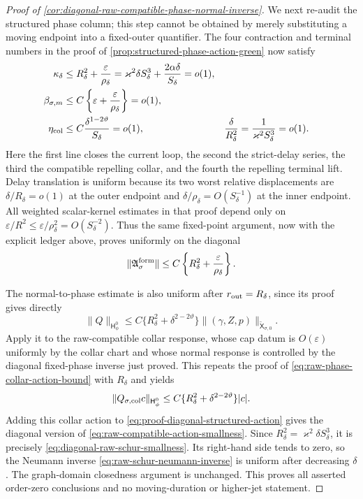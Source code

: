 \begin{proof}[Proof of
\cref{cor:diagonal-raw-compatible-phase-normal-inverse}]
We next re-audit the structured phase column; this step cannot be obtained
by merely substituting a moving endpoint into a fixed-outer quantifier.
The four contraction and terminal numbers in the proof of
\cref{prop:structured-phase-action-green} now satisfy
\begin{align}
 \kappa_\delta
 &\le R_\delta^2+\frac{\varepsilon}{\rho_\delta}
 =\varkappa^2\delta S_\delta^3
       +\frac{2\alpha\delta}{S_\delta}=o(1),\notag\\
 \beta_{\sigma,m}
 &\le C\left\{\varepsilon
       +\frac{\varepsilon}{\rho_\delta}\right\}
 =o(1),\notag\\
 \eta_{\rm col}
 &\le C\frac{\delta^{1-2\vartheta}}{S_\delta}=o(1),
 &\frac{\delta}{R_\delta^2}
 &=\frac1{\varkappa^2S_\delta^3}=o(1).
                                                        \label{eq:proof-diagonal-structured-ledger}
\end{align}
Here the first line closes the current loop, the second the strict-delay
series, the third the compatible repelling collar, and the fourth the
repelling terminal lift.  Delay translation is uniform because its two
worst relative displacements are
\(\delta/R_\delta=o(1)\) at the outer endpoint and
\(\delta/\rho_\delta=O(S_\delta^{-1})\) at the inner endpoint.
All weighted scalar-kernel estimates in that proof depend only on
\(\varepsilon/R^2\le\varepsilon/\rho_\delta^2=O(S_\delta^{-2})\).
Thus the same fixed-point argument, now with the explicit ledger above,
proves uniformly on the diagonal
\begin{equation}
 \|\mathfrak A_\sigma^{\rm form}\|
 \le C\left\{R_\delta^2+\frac{\varepsilon}{\rho_\delta}\right\}.
                                                        \label{eq:proof-diagonal-structured-action}
\end{equation}

The normal-to-phase estimate is also uniform after
\(r_{\rm out}=R_\delta\), since its proof gives directly
\[
 \|Q\|_{\mathsf H_\phi^0}
 \le C\{R_\delta^2+\delta^{2-2\vartheta}\}
       \|(\gamma,Z,p)\|_{\widetilde{\mathsf X}_{\sigma,0}}.
\]
Apply it to the raw-compatible collar response, whose cap datum is
\(O(\varepsilon)\) uniformly by the collar chart and whose normal response
is controlled by the diagonal fixed-phase inverse just proved.  This
repeats the proof of
\cref{eq:raw-phase-collar-action-bound} with \(R_\delta\) and yields
\[
 \|Q_{\sigma,\rm col}c\|_{\mathsf H_\phi^0}
 \le C\{R_\delta^2+\delta^{2-2\vartheta}\}|c|.
\]
Adding this collar action to
\cref{eq:proof-diagonal-structured-action} gives the diagonal version of
\cref{eq:raw-compatible-action-smallness}.  Since
\(R_\delta^2=\varkappa^2\delta S_\delta^3\), it is precisely
\cref{eq:diagonal-raw-schur-smallness}.  Its right-hand side tends to zero,
so the Neumann inverse
\cref{eq:raw-schur-neumann-inverse} is uniform after decreasing
\(\delta\).  The graph-domain closedness argument is unchanged.  This
proves all asserted order-zero conclusions and no moving-duration or
higher-jet statement.
\end{proof}

